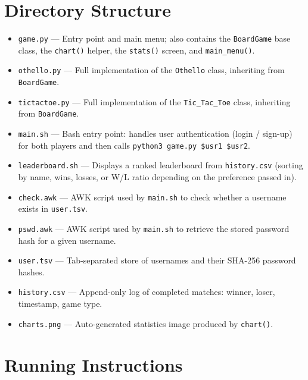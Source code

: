 \documentclass[12pt]{article}
\begin{document}
\section{Directory Structure}

\begin{itemize}[leftmargin=2em]
    \item \texttt{game.py} --- Entry point and main menu; also contains the \texttt{BoardGame} base class, the \texttt{chart()} helper, the \texttt{stats()} screen, and \texttt{main\_menu()}.
    \item \texttt{othello.py} --- Full implementation of the \texttt{Othello} class, inheriting from \texttt{BoardGame}.
    \item \texttt{tictactoe.py} --- Full implementation of the \texttt{Tic\_Tac\_Toe} class, inheriting from \texttt{BoardGame}.
    \item \texttt{main.sh} --- Bash entry point: handles user authentication (login / sign-up) for both players and then calls \texttt{python3 game.py \$usr1 \$usr2}.
    \item \texttt{leaderboard.sh} --- Displays a ranked leaderboard from \texttt{history.csv} (sorting by name, wins, losses, or W/L ratio depending on the preference passed in).
    \item \texttt{check.awk} --- AWK script used by \texttt{main.sh} to check whether a username exists in \texttt{user.tsv}.
    \item \texttt{pswd.awk} --- AWK script used by \texttt{main.sh} to retrieve the stored password hash for a given username.
    \item \texttt{user.tsv} --- Tab-separated store of usernames and their SHA-256 password hashes.
    \item \texttt{history.csv} --- Append-only log of completed matches: winner, loser, timestamp, game type.
    \item \texttt{charts.png} --- Auto-generated statistics image produced by \texttt{chart()}.
\end{itemize}

\section{Running Instructions}
\end{document}
